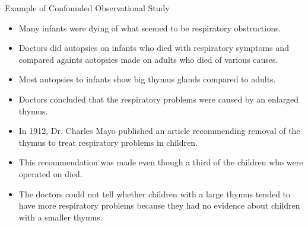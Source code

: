 \documentclass[handout]{beamer}
\begin{document}
\begin{frame}{Example of Confounded Observational Study}
\scriptsize{

\begin{itemize}

 \item Many infants were dying of what seemed to be respiratory obstructions.
 
 \item Doctors did autopsies on infants who died with respiratory symptoms and compared againts aotopsies made on adults who died of various causes.

\item Most autopsies to infants show big thymus glands compared to adults.

\item Doctors concluded that the respiratory problems were caused by an enlarged thymus. 


\item In 1912, Dr. Charles Mayo published an article recommending removal of the thymus to treat respiratory problems in children. 

\item This recommendation was made even though a third of the
children who were operated on died. 
  
\item The doctors could not tell whether children with a large thymus tended to have more respiratory problems because they had no evidence about children with a smaller thymus.  
  
\end{itemize}



} 
\end{frame}
\end{document}

